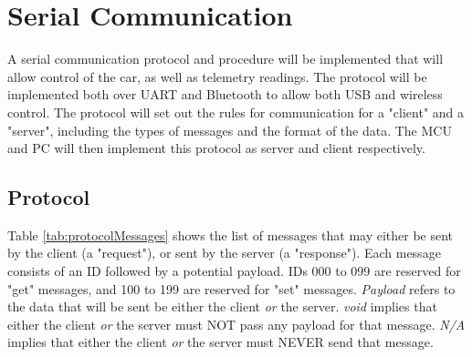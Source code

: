 \graphicspath{{content/2_design/figures/}}
\section{Serial Communication}

A serial communication protocol and procedure will be implemented that will allow control of the car, as well as telemetry readings.
The protocol will be implemented both over UART and Bluetooth to allow both USB and wireless control. The protocol will set out
the rules for communication for a "client" and a "server", including the types of messages and the format of the data.
The MCU and PC will then implement this protocol as server and client respectively.

\subsection{Protocol}

Table \ref{tab:protocolMessages} shows the list of messages that may either be sent by the client (a "request"),
or sent by the server (a "response"). Each message consists of an ID followed by a potential payload.
IDs 000 to 099 are reserved for "get" messages, and 100 to 199 are reserved for "set" messages.
\textit{Payload} refers to the data that will be sent be either the client \textit{or} the server.
\textit{void} implies that either the client \textit{or} the server must NOT pass any payload for that message.
\textit{N/A} implies that either the client \textit{or} the server must NEVER send that message.

